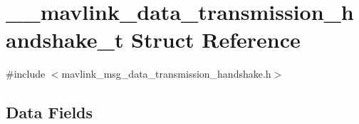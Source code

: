 \hypertarget{struct____mavlink__data__transmission__handshake__t}{\section{\+\_\+\+\_\+mavlink\+\_\+data\+\_\+transmission\+\_\+handshake\+\_\+t Struct Reference}
\label{struct____mavlink__data__transmission__handshake__t}
}


{\ttfamily \#include $<$mavlink\+\_\+msg\+\_\+data\+\_\+transmission\+\_\+handshake.\+h$>$}

\subsection*{Data Fields}
